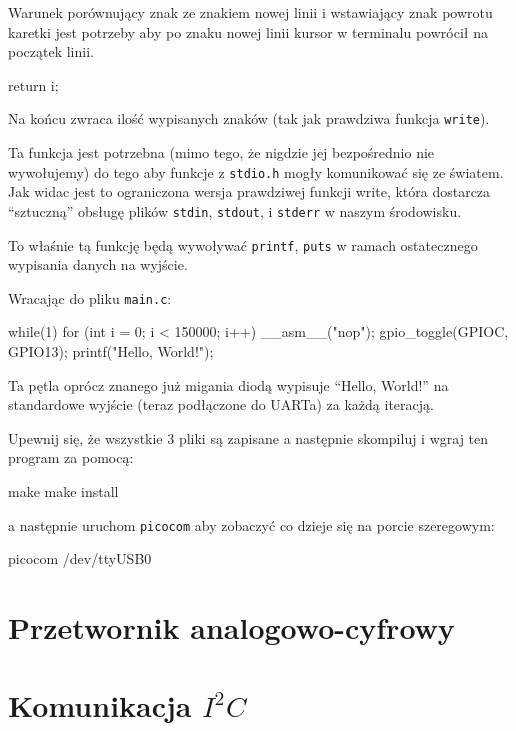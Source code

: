 \documentclass{pdfBooklets}
\begin{document}
Warunek porównujący znak ze znakiem nowej linii i wstawiający znak powrotu karetki jest potrzeby aby po znaku nowej linii kursor w terminalu powrócił
na początek linii.


\begin{CodeFrame*}[c]{}
  return i;
\end{CodeFrame*}

Na końcu zwraca ilość wypisanych znaków (tak jak prawdziwa funkcja \Verb$write$).

Ta funkcja jest potrzebna (mimo tego, że nigdzie jej bezpośrednio nie wywołujemy) do tego aby funkcje z \Verb$stdio.h$ mogły komunikować się ze światem.
Jak widac jest to ograniczona wersja prawdziwej funkcji write, która dostarcza ``sztuczną'' obsługę plików \Verb$stdin$, \Verb$stdout$, i \Verb$stderr$
w naszym środowisku. 

To właśnie tą funkcję będą wywoływać \Verb$printf$, \Verb$puts$ w ramach ostatecznego wypisania danych na wyjście.

Wracając do pliku \Verb$main.c$:

\begin{CodeFrame*}[c]{}
  while(1){
    for (int i = 0; i < 150000; i++) __asm__("nop");
    gpio_toggle(GPIOC, GPIO13);
    printf("Hello, World!\n");
  }
\end{CodeFrame*}

Ta pętla oprócz znanego już migania diodą wypisuje ``Hello, World!'' na standardowe wyjście (teraz podłączone do UARTa) za każdą iteracją.


Upewnij się, że wszystkie 3 pliki są zapisane a następnie skompiluj i wgraj ten program za pomocą:

\begin{CodeFrame*}[bash]{}
  make
  make install
\end{CodeFrame*}

a następnie uruchom \Verb$picocom$ aby zobaczyć co dzieje się na porcie szeregowym:


\begin{CodeFrame*}[bash]{}
  picocom /dev/ttyUSB0
\end{CodeFrame*}

\section{Przetwornik analogowo-cyfrowy}
\section{Komunikacja $I^2C$}
\end{document}
